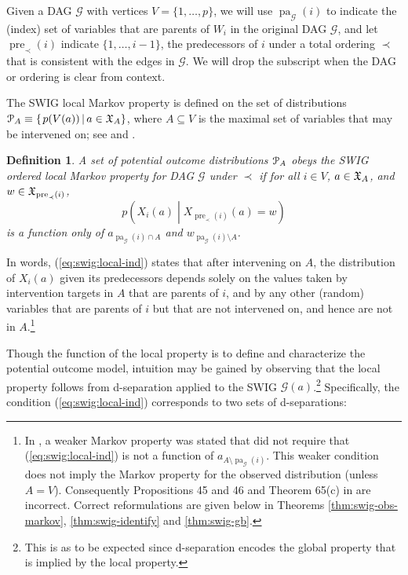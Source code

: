 \documentclass[11pt]{article}
\DeclareMathOperator{\pa}{pa}
\DeclareMathOperator{\pre}{pre}
\newtheorem{definition}[theorem]{Definition}
\newcommand{\G}{{\mathscr G}}
\begin{document}
Given a DAG $\G$ with vertices $V=\{1,\ldots ,p\}$, we will use $\pa_{\G}(i)$ to indicate the (index) set of variables that are parents of $W_i$ in the original DAG $\G$, and let $\pre_{\prec}(i)$  indicate  $\{1,\ldots ,i-1\}$, the predecessors of $i$ under a total ordering $\prec$ that is consistent with the edges in $\G$. We will drop the subscript when the DAG or ordering is clear from context.

The SWIG local Markov property is defined on the set of distributions
${\cal P}_A \equiv \left\{\left. p(V({a}))\,\right| a \in \mathfrak{X}_{A}\right\}$, where $A\subseteq V$ is the maximal set of variables that may be intervened on; see \citet[\S1.2.4]{shpitser2021multivariate} and \citet{shpitser2021partially}.

\begin{definition}\label{def:local-swig-mp}
A set of potential outcome distributions ${\cal P}_A$ obeys {\em the SWIG ordered local Markov property 
for DAG $\G$ under $\prec$} if for all  $i \in V$, ${a} \in \frak{X}_A$, and  ${w} \in \frak{X}_{\pre_{\prec}(i)}$,
\begin{equation}\label{eq:swig:local-ind}
p\left(X_i({a}) \;\left|\; X_{\pre_{\prec}(i)}({a})\!=\! w \right.\right)
\end{equation}
is a function only of $a_{\pa_{\G}(i)\cap A}$ and $w_{\pa_{\G}(i)\setminus A}$.
\end{definition}

In words, (\ref{eq:swig:local-ind}) states that after intervening on $A$, the distribution of $X_i(a)$ given its predecessors depends solely on the values taken by intervention targets in $A$ that are parents of $i$, and by any other (random) variables that are parents of $i$ but that are not intervened on, and hence are not in $A$.\footnote{
In \citet[\S8, Def.44]{thomas13swig}, a weaker Markov property was stated that did not require that (\ref{eq:swig:local-ind}) is not a function of $a_{A\setminus \pa_{\G}(i)}$. 
This weaker condition does not imply the Markov property for the observed distribution (unless $A=V$). Consequently Propositions 45 and 46 and Theorem 65(c) in
\citet{thomas13swig} are incorrect. Correct reformulations are given below in Theorems \ref{thm:swig-obs-markov}, \ref{thm:swig-identify} and \ref{thm:swig-gb}.
}

Though the function of the local property is to define and characterize the potential outcome model, intuition may be gained by observing 
that the local property follows from d-separation applied to the SWIG $\G({ a})$.\footnote{This is as to be expected since d-separation encodes
the global property that is implied by the local property.} Specifically, the condition (\ref{eq:swig:local-ind}) corresponds to two sets of d-separations:
\medskip
\end{document}
